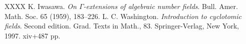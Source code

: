 \therefsection

\begin{thebibliography}{XXXX}
K. Iwasawa.
\emph{On $\Gamma$-extensions of algebraic number fields}.
Bull. Amer. Math. Soc. 65 (1959), 183--226.
L. C. Washington.
\emph{Introduction to cyclotomic fields}.
Second edition.
Grad. Texts in Math., 83.
Springer-Verlag, New York, 1997. xiv+487 pp.
\end{thebibliography}

